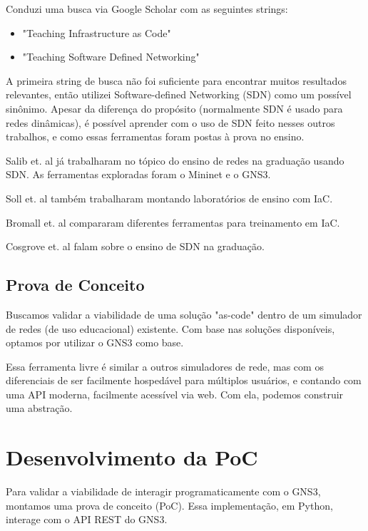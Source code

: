 \documentclass[12pt]{article}
\begin{document}
Conduzi uma busca via Google Scholar com as seguintes strings:

\begin{itemize}
    \item "Teaching Infrastructure as Code"
    \item "Teaching Software Defined Networking"
\end{itemize}

A primeira string de busca não foi suficiente para encontrar muitos resultados
relevantes, então utilizei Software-defined Networking (SDN) como um possível
sinônimo. Apesar da diferença do propósito (normalmente SDN é usado para redes
dinâmicas\cite{vsuh2017designing}), é possível aprender com o uso de SDN feito
nesses outros trabalhos, e como essas ferramentas foram postas à prova no
ensino\cite{salib2018hands}.

Salib et. al\cite{salib2018hands} já trabalharam no tópico do ensino de redes
na graduação usando SDN. As ferramentas exploradas foram o
Mininet\cite{mininet} e o GNS3\cite{gns3api}.

Soll et. al\cite{soll2023building} também trabalharam montando laboratórios de
ensino com IaC.

Bromall et. al\cite{bromall2022comparison} compararam diferentes ferramentas
para treinamento em IaC.

Cosgrove et. al\cite{cosgrove2016teaching} falam sobre o ensino de SDN na
graduação.



\subsection{Prova de Conceito}

Buscamos validar a viabilidade de uma solução "as-code" dentro de um simulador
de redes (de uso educacional) existente. Com base nas soluções disponíveis,
optamos por utilizar o GNS3\cite{gns3} como base.

Essa ferramenta livre é similar a outros simuladores de rede, mas com os
diferenciais de ser facilmente hospedável para múltiplos usuários, e contando
com uma API moderna, facilmente acessível via web. Com ela, podemos construir
uma abstração.

\section{Desenvolvimento da PoC}

Para validar a viabilidade de interagir programaticamente com o GNS3, montamos
uma prova de conceito (PoC). Essa implementação, em Python, interage com o API
REST do GNS3\cite{gns3api}.
\end{document}

